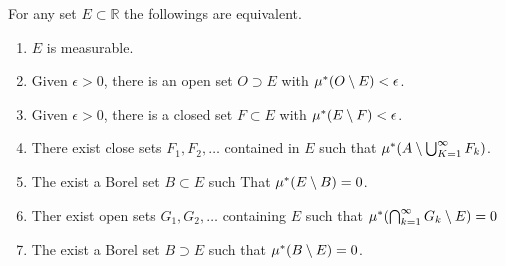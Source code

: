 \begin{theorem}
    For any set $E\subset\mathds{R}$ the followings are equivalent.
    \begin{enumerate}
        \item $E$ is measurable.
        \item Given  $\epsilon>0$, there is an open set  $O\supset E$ with  $\mu^{*}(O\setminus E)<\epsilon$.
        \item Given $\epsilon>0$, there is a closed set  $F\subset E$ with  $\mu^{*}(E\setminus F)<\epsilon$.
        \item There exist close sets $F_1,F_2,\ldots$ contained in $E$ such that  $\mu^{*}(A\setminus \bigcup_{K=1}^{\infty}F_k)$.
        \item The exist a Borel set $B\subset E$ such That  $\mu^{*}(E\setminus B)=0$.
        \item Ther exist open sets $G_1,G_2,\ldots$ containing $E$ such that  $\mu^{*}(\bigcap_{k=1}^{\infty}G_k\setminus E)=0$
        \item The exist a Borel set $B\supset E$ such that  $\mu^{*}(B\setminus E)=0$.
    \end{enumerate}
\end{theorem}
